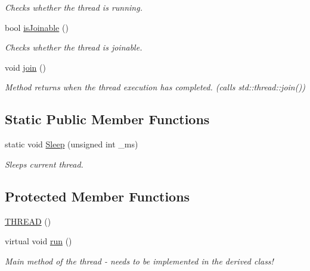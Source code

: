\begin{DoxyCompactItemize}
\begin{DoxyCompactList}\small\item\em Checks whether the thread is running. \end{DoxyCompactList}\item 
bool \hyperlink{class_marox_1_1_threading_1_1_t_h_r_e_a_d_a249e970775835aeb4c7b98bdfda9cb3c}{is\+Joinable} ()
\begin{DoxyCompactList}\small\item\em Checks whether the thread is joinable. \end{DoxyCompactList}\item 
void \hyperlink{class_marox_1_1_threading_1_1_t_h_r_e_a_d_a24c2b78759ef0ffd91f8d4f6bf8dc163}{join} ()
\begin{DoxyCompactList}\small\item\em Method returns when the thread execution has completed. (calls {\ttfamily std\+::thread\+::join()}) \end{DoxyCompactList}\end{DoxyCompactItemize}
\subsection*{Static Public Member Functions}
\begin{DoxyCompactItemize}
\item 
static void \hyperlink{class_marox_1_1_threading_1_1_t_h_r_e_a_d_a70b477f43d1c876405f8ed53d7b0f468}{Sleep} (unsigned int \+\_\+ms)
\begin{DoxyCompactList}\small\item\em Sleeps current thread. \end{DoxyCompactList}\end{DoxyCompactItemize}
\subsection*{Protected Member Functions}
\begin{DoxyCompactItemize}
\item 
\hyperlink{class_marox_1_1_threading_1_1_t_h_r_e_a_d_a05c267524f53d25cac8bd80e4890570d}{T\+H\+R\+E\+A\+D} ()
\item 
virtual void \hyperlink{class_marox_1_1_threading_1_1_t_h_r_e_a_d_ab7177d6c63517e76422a4a9c22069346}{run} ()
\begin{DoxyCompactList}\small\item\em Main method of the thread -\/ needs to be implemented in the derived class! \end{DoxyCompactList}\end{DoxyCompactItemize}


